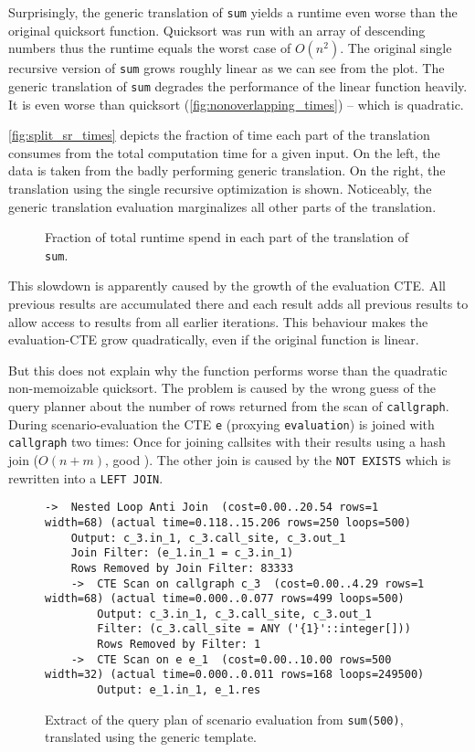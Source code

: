 Surprisingly, the generic translation of \texttt{sum} yields a runtime even worse than the original quicksort function. Quicksort was run with an array of descending numbers thus the runtime equals the worst case of $O(n^2)$. The original single recursive version of \texttt{sum} grows roughly linear as we can see from the plot. The generic translation of \texttt{sum} degrades the performance of the linear function heavily. It is even worse than quicksort (\autoref{fig:nonoverlapping_times}) -- which is quadratic.

\autoref{fig:split_sr_times} depicts the fraction of time each part of the translation consumes from the total computation time for a given input. On the left, the data is taken from the badly performing generic translation. On the right, the translation using the single recursive optimization is shown. Noticeably, the generic translation evaluation marginalizes all other parts of the translation.

\begin{figure}[h!]
    \centering\small
    
    \caption{Fraction of total runtime spend in each part of the translation of \texttt{sum}.}
    \label{fig:split_sr_times}
\end{figure}

This slowdown is apparently caused by the growth of the evaluation CTE. All previous results are accumulated there and each result adds all previous results to allow access to results from all earlier iterations. This behaviour makes the evaluation-CTE grow quadratically, even if the original function is linear.

But this does not explain why the function performs worse than the quadratic non-memoizable quicksort. The problem is caused by the wrong guess of the query planner about the number of rows returned from the scan of \texttt{callgraph}. During scenario-evaluation the CTE \texttt{e} (proxying \texttt{evaluation}) is joined with \texttt{callgraph} two times: Once for joining callsites with their results using a hash join ($O(n+m)$, good \cite[p. 463 ff.]{DMS}). The other join is caused by the \texttt{NOT EXISTS} which is rewritten into a \texttt{LEFT JOIN}.

\begin{figure}[h!]
    \centering\scriptsize
    \begin{verbatim}
->  Nested Loop Anti Join  (cost=0.00..20.54 rows=1 width=68) (actual time=0.118..15.206 rows=250 loops=500)
	Output: c_3.in_1, c_3.call_site, c_3.out_1
	Join Filter: (e_1.in_1 = c_3.in_1)
	Rows Removed by Join Filter: 83333
	->  CTE Scan on callgraph c_3  (cost=0.00..4.29 rows=1 width=68) (actual time=0.000..0.077 rows=499 loops=500)
	    Output: c_3.in_1, c_3.call_site, c_3.out_1
	    Filter: (c_3.call_site = ANY ('{1}'::integer[]))
	    Rows Removed by Filter: 1
	->  CTE Scan on e e_1  (cost=0.00..10.00 rows=500 width=32) (actual time=0.000..0.011 rows=168 loops=249500)
	    Output: e_1.in_1, e_1.res
    \end{verbatim}
    \caption{Extract of the query plan of scenario evaluation from \texttt{sum(500)}, translated using the generic template.}
    \label{plan:sum}
\end{figure}

